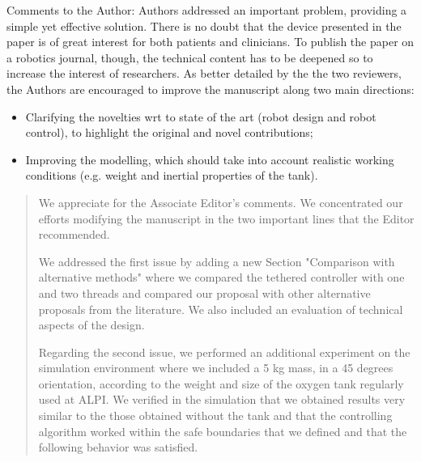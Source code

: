 \documentclass[journal,onecolumn,12pt]{IEEEtran}
\begin{document}
Comments to the Author:
Authors addressed an important problem, providing a simple yet effective solution. There is no doubt that the device presented in the paper is of great interest for both patients and clinicians. To publish the paper on a robotics journal, though, the technical content has to be deepened so to increase the interest of researchers.
As better detailed by the the two reviewers, the Authors are encouraged to improve the manuscript along two main directions:

\begin{itemize}
\item Clarifying the novelties wrt to state of the art (robot design and robot control), to highlight the original and novel contributions;
\item  Improving the modelling, which should take into account realistic working conditions (e.g. weight and inertial properties of the tank).
\end{itemize}


\begin{quotation}
{\color{blue}
We appreciate for the Associate Editor's comments.  We concentrated our efforts modifying the manuscript in the two important lines that the Editor recommended.  

We addressed the first issue by adding a new Section "Comparison with alternative methods" where we compared the tethered controller with one and two threads and compared our proposal with other alternative proposals from the literature.  We also included an evaluation of technical aspects of the design.

Regarding the second issue, we performed an additional experiment on the simulation environment where we included a 5 kg mass, in a 45 degrees orientation, according to the weight and size of the oxygen tank regularly used at ALPI.  We verified in the simulation that we obtained results very similar to the those obtained without the tank and that the controlling algorithm worked within the safe boundaries that we defined and that the following behavior was satisfied.
}
\end{quotation}


\section*{}

\end{document}
